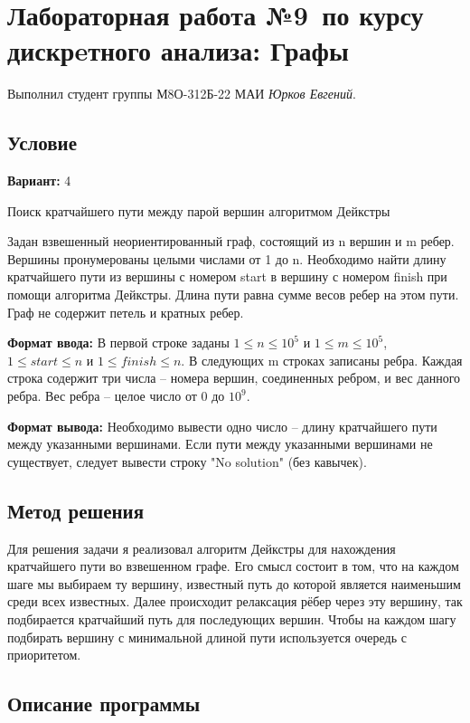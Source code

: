 \documentclass[12pt]{article}
\begin{document}
\section*{Лабораторная работа №9\, по курсу дискрeтного анализа: Графы}

Выполнил студент группы М8О-312Б-22 МАИ \textit{Юрков Евгений}.

\subsection*{Условие}

\textbf{Вариант:} 4

Поиск кратчайшего пути между парой вершин алгоритмом Дейкстры

Задан взвешенный неориентированный граф, состоящий из n вершин и m ребер.
Вершины пронумерованы целыми числами от 1 до n.
Необходимо найти длину кратчайшего пути из вершины с номером start в вершину с номером finish
при помощи алгоритма Дейкстры. Длина пути равна сумме весов ребер на этом пути.
Граф не содержит петель и кратных ребер.

\textbf{Формат ввода:}
В первой строке заданы $1 \leq n \leq 10^5$ и $1 \leq m \leq 10^5$, $1 \leq start \leq n$ и $1 \leq finish \leq n$.
В следующих m строках записаны ребра.
Каждая строка содержит три числа – номера вершин, соединенных ребром, и вес данного ребра. Вес ребра – целое число от 0 до $10^9$.

\textbf{Формат вывода:}
Необходимо вывести одно число – длину кратчайшего пути между указанными вершинами.
Если пути между указанными вершинами не существует, следует вывести строку "No solution" (без кавычек).
\newpage
\subsection*{Метод решения}

Для решения задачи я реализовал алгоритм Дейкстры для нахождения кратчайшего пути во взвешенном графе.
Его смысл состоит в том, что на каждом шаге мы выбираем ту вершину, известный путь до которой является наименьшим среди всех известных.
Далее происходит релаксация рёбер через эту вершину, так подбирается кратчайший путь для последующих вершин.
Чтобы на каждом шагу подбирать вершину с минимальной длиной пути используется очередь с приоритетом.

\subsection*{Описание программы}
\end{document}
